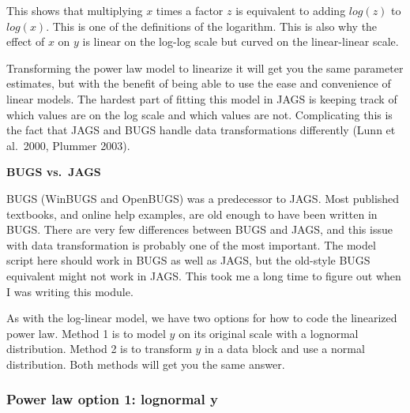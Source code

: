 \documentclass[
  13,
  letterpaper,
]{report}
\newenvironment{Shaded}{\begin{snugshade}}{\end{snugshade}}
\newcommand{\AttributeTok}[1]{\textcolor[rgb]{0.40,0.45,0.13}{#1}}
\newcommand{\CommentTok}[1]{\textcolor[rgb]{0.37,0.37,0.37}{#1}}
\newcommand{\DecValTok}[1]{\textcolor[rgb]{0.68,0.00,0.00}{#1}}
\newcommand{\FloatTok}[1]{\textcolor[rgb]{0.68,0.00,0.00}{#1}}
\newcommand{\FunctionTok}[1]{\textcolor[rgb]{0.28,0.35,0.67}{#1}}
\newcommand{\NormalTok}[1]{\textcolor[rgb]{0.00,0.23,0.31}{#1}}
\newcommand{\OtherTok}[1]{\textcolor[rgb]{0.00,0.23,0.31}{#1}}
\newcommand{\SpecialCharTok}[1]{\textcolor[rgb]{0.37,0.37,0.37}{#1}}
\begin{document}
This shows that multiplying \(x\) times a factor \(z\) is equivalent to
adding \(log(z)\) to \(log(x)\). This is one of the definitions of the
logarithm. This is also why the effect of \(x\) on \(y\) is linear on
the log-log scale but curved on the linear-linear scale.

Transforming the power law model to linearize it will get you the same
parameter estimates, but with the benefit of being able to use the ease
and convenience of linear models. The hardest part of fitting this model
in JAGS is keeping track of which values are on the log scale and which
values are not. Complicating this is the fact that JAGS and BUGS handle
data transformations differently (Lunn et al.~2000, Plummer 2003).

\textbf{BUGS vs.~JAGS}

BUGS (WinBUGS and OpenBUGS) was a predecessor to JAGS. Most published
textbooks, and online help examples, are old enough to have been written
in BUGS. There are very few differences between BUGS and JAGS, and this
issue with data transformation is probably one of the most important.
The model script here should work in BUGS as well as JAGS, but the
old-style BUGS equivalent might not work in JAGS. This took me a long
time to figure out when I was writing this module.

As with the log-linear model, we have two options for how to code the
linearized power law. Method 1 is to model \(y\) on its original scale
with a lognormal distribution. Method 2 is to transform \(y\) in a data
block and use a normal distribution. Both methods will get you the same
answer.

\subsubsection{Power law option 1: lognormal
y}\label{power-law-option-1-lognormal-y}

\begin{Shaded}
\end{Shaded}
\end{document}
